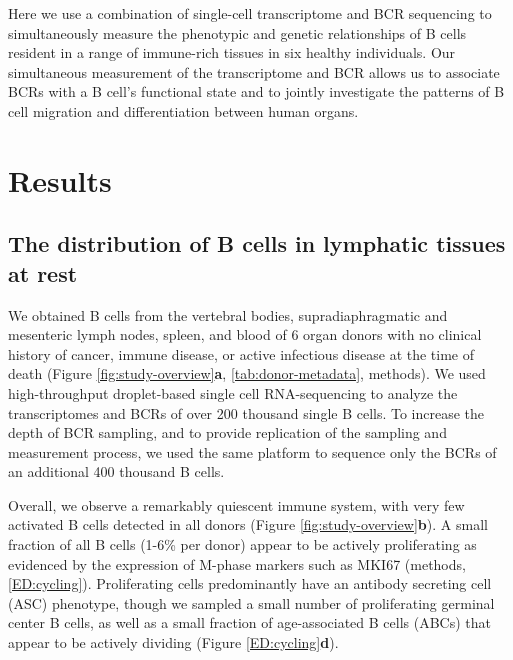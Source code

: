 Here we use a combination of single-cell transcriptome and BCR sequencing to simultaneously measure the phenotypic and genetic relationships of B cells resident in a range of immune-rich tissues in six healthy individuals. Our simultaneous measurement of the transcriptome and BCR allows us to associate BCRs with a B cell's functional state and to jointly investigate the patterns of B cell migration and differentiation between human organs.
\section{Results}

\subsection{The distribution of B cells in lymphatic tissues at rest}
 We obtained B cells from the vertebral bodies, supradiaphragmatic and mesenteric lymph nodes, spleen, and blood of 6 organ donors with no clinical history of cancer, immune disease, or active infectious disease at the time of death (Figure \ref{fig:study-overview}\textbf{a}, \ref{tab:donor-metadata}, methods). We used high-throughput droplet-based single cell RNA-sequencing to analyze the transcriptomes and BCRs of over 200 thousand single B cells. To increase the depth of BCR sampling, and to provide replication of the sampling and measurement process, we used the same platform to sequence only the BCRs of an additional 400 thousand B cells. 

Overall, we observe a remarkably quiescent immune system, with very few activated B cells detected in all donors (Figure \ref{fig:study-overview}\textbf{b}). A small fraction of all B cells (1-6\% per donor) appear to be actively proliferating as evidenced by the expression of M-phase markers such as MKI67 (methods, \ref{ED:cycling}).  Proliferating cells predominantly have an antibody secreting cell (ASC) phenotype, though we sampled a small number of proliferating germinal center B cells, as well as a small fraction of age-associated B cells (ABCs) that appear to be actively dividing (Figure \ref{ED:cycling}\textbf{d}).

